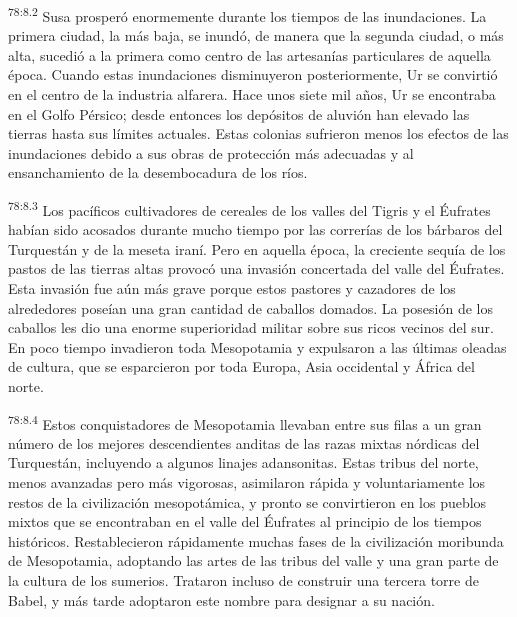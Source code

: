 \par
\textsuperscript{78:8.2} Susa prosperó enormemente durante los tiempos de las inundaciones. La primera ciudad, la más baja, se inundó, de manera que la segunda ciudad, o más alta, sucedió a la primera como centro de las artesanías particulares de aquella época. Cuando estas inundaciones disminuyeron posteriormente, Ur se convirtió en el centro de la industria alfarera. Hace unos siete mil años, Ur se encontraba en el Golfo Pérsico; desde entonces los depósitos de aluvión han elevado las tierras hasta sus límites actuales. Estas colonias sufrieron menos los efectos de las inundaciones debido a sus obras de protección más adecuadas y al ensanchamiento de la desembocadura de los ríos.

\par
\textsuperscript{78:8.3} Los pacíficos cultivadores de cereales de los valles del Tigris y el Éufrates habían sido acosados durante mucho tiempo por las correrías de los bárbaros del Turquestán y de la meseta iraní. Pero en aquella época, la creciente sequía de los pastos de las tierras altas provocó una invasión concertada del valle del Éufrates. Esta invasión fue aún más grave porque estos pastores y cazadores de los alrededores poseían una gran cantidad de caballos domados. La posesión de los caballos les dio una enorme superioridad militar sobre sus ricos vecinos del sur. En poco tiempo invadieron toda Mesopotamia y expulsaron a las últimas oleadas de cultura, que se esparcieron por toda Europa, Asia occidental y África del norte.

\par
\textsuperscript{78:8.4} Estos conquistadores de Mesopotamia llevaban entre sus filas a un gran número de los mejores descendientes anditas de las razas mixtas nórdicas del Turquestán, incluyendo a algunos linajes adansonitas. Estas tribus del norte, menos avanzadas pero más vigorosas, asimilaron rápida y voluntariamente los restos de la civilización mesopotámica, y pronto se convirtieron en los pueblos mixtos que se encontraban en el valle del Éufrates al principio de los tiempos históricos. Restablecieron rápidamente muchas fases de la civilización moribunda de Mesopotamia, adoptando las artes de las tribus del valle y una gran parte de la cultura de los sumerios. Trataron incluso de construir una tercera torre de Babel, y más tarde adoptaron este nombre para designar a su nación.

